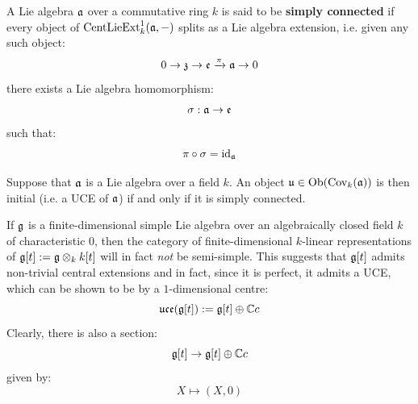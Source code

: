         \begin{definition}
            A Lie algebra $\mathfrak{a}$ over a commutative ring $k$ is said to be \textbf{simply connected} if every object of $\mathrm{Cent}\mathrm{Lie}\mathrm{Ext}^1_k(\mathfrak{a}, -)$ splits as a Lie algebra extension, i.e. given any such object:
                $$0 \to \mathfrak{z} \to \mathfrak{e} \xrightarrow[]{\pi} \mathfrak{a} \to 0$$
            there exists a Lie algebra homomorphism:
                $$\sigma: \mathfrak{a} \to \mathfrak{e}$$
            such that:
                $$\pi \circ \sigma = \mathrm{id}_{\mathfrak{a}}$$
        \end{definition}
        \begin{proposition}
            \cite[Theorem 1.16]{garland_arithmetics_of_loop_groups} Suppose that $\mathfrak{a}$ is a Lie algebra over a field $k$. An object $\mathfrak{u} \in \mathrm{Ob}( \mathrm{Cov}_k(\mathfrak{a}) )$ is then initial (i.e. a UCE of $\mathfrak{a}$) if and only if it is simply connected. 
        \end{proposition}
        \begin{example}
            If $\mathfrak{g}$ is a finite-dimensional simple Lie algebra over an algebraically closed field $k$ of characteristic $0$, then the category of finite-dimensional $k$-linear representations of $\g[t] := \g \tensor_k k[t]$ will in fact \textit{not} be semi-simple. This suggests that $\mathfrak{g}[t]$ admits non-trivial central extensions and in fact, since it is perfect, it admits a UCE, which can be shown to be by a $1$-dimensional centre:
                $$\mathfrak{uce}(\mathfrak{g}[t]) := \mathfrak{g}[t] \oplus \mathbb{C} c$$
            Clearly, there is also a section:
                $$\mathfrak{g}[t] \to \mathfrak{g}[t] \oplus \mathbb{C} c$$
            given by:
                $$X \mapsto (X, 0)$$
        \end{example}